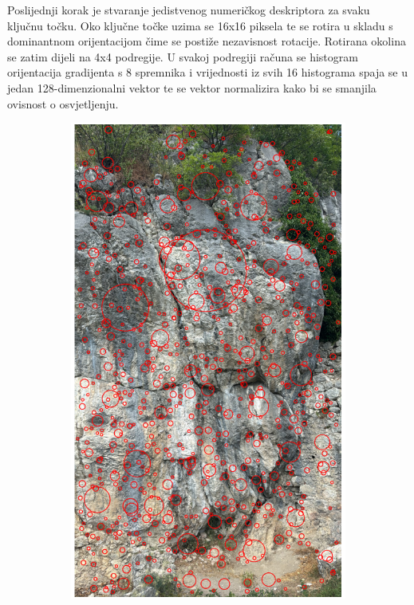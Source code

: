 Poslijednji korak je stvaranje jedistvenog numeričkog deskriptora za svaku ključnu točku. Oko ključne točke uzima se 16x16 piksela te se rotira u skladu s dominantnom orijentacijom čime se postiže nezavisnost rotacije. Rotirana okolina se zatim dijeli na 4x4 podregije. U svakoj podregiji računa se histogram orijentacija gradijenta s 8 spremnika i vrijednosti iz svih 16 histograma spaja se u jedan 128-dimenzionalni vektor te se vektor normalizira kako bi se smanjila ovisnost o osvjetljenju.

\begin{figure}[H]
    \centering
    \begin{subfigure}[b]{0.48\textwidth}
        \centering
        \includegraphics[width=\textwidth]{images/racunalniVid/feature_detection_train.png}

\end{subfigure}
\end{figure}
